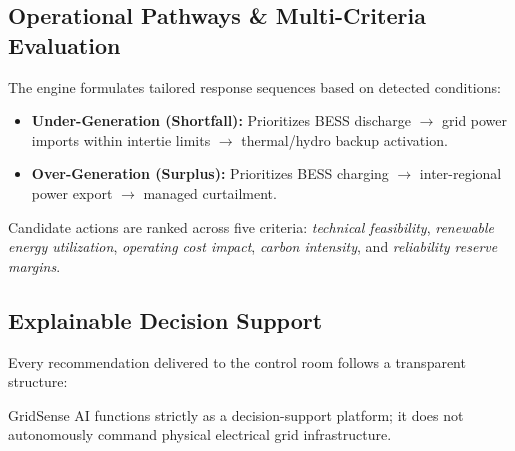 \subsection{Operational Pathways \& Multi-Criteria Evaluation}
\label{subsec:operational_pathways}

The engine formulates tailored response sequences based on detected conditions:
\begin{itemize}[leftmargin=1.5em, itemsep=0.2em]
    \item \textbf{Under-Generation (Shortfall):} Prioritizes BESS discharge $\rightarrow$ grid power imports within intertie limits $\rightarrow$ thermal/hydro backup activation.
    \item \textbf{Over-Generation (Surplus):} Prioritizes BESS charging $\rightarrow$ inter-regional power export $\rightarrow$ managed curtailment.
\end{itemize}

Candidate actions are ranked across five criteria: \emph{technical feasibility}, \emph{renewable energy utilization}, \emph{operating cost impact}, \emph{carbon intensity}, and \emph{reliability reserve margins}.

\subsection{Explainable Decision Support}
\label{subsec:explainable_output}

Every recommendation delivered to the control room follows a transparent structure:
\begin{center}
\end{center}
GridSense AI functions strictly as a decision-support platform; it does not autonomously command physical electrical grid infrastructure.
